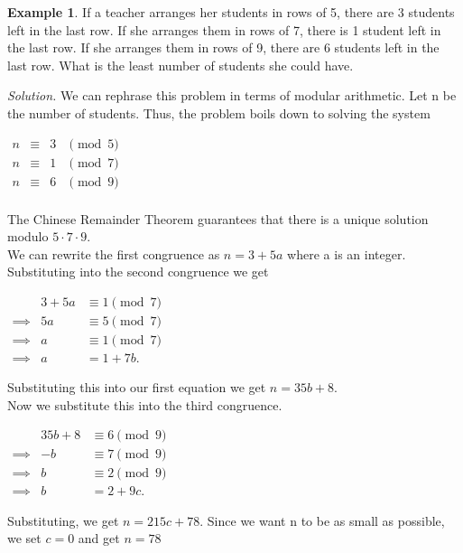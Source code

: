 \documentclass[letterpaper]{article}
\theoremstyle{plain}
\theoremstyle{definition}
\newtheorem{example}[thm]{Example}
\theoremstyle{remark}
\begin{document}
\begin{mdframed}
    \begin{example}
    If a teacher arranges her students in rows of 5, there are 3 students left in the last row.
    If she arranges them in rows of 7, there is 1 student left in the last row. If she arranges them in rows of 9, 
    there are 6 students left in the last row. What is the least number of students she could have.
    \end{example}
\end{mdframed}
\emph{Solution.} We can rephrase this problem in terms of modular arithmetic. Let n be the number of students. Thus, the problem boils down to solving the system
    \begin{center}
        $\begin{array}{rcll}
            n &\equiv &3 &\pmod{5}\\
            n &\equiv &1 &\pmod{7}\\
            n &\equiv &6 &\pmod{9}\\
        \end{array}$
    \end{center}
    The Chinese Remainder Theorem guarantees that there is a unique solution modulo $5\cdot 7 \cdot 9$.\\
    We can rewrite the first congruence as $n = 3 + 5a$ where a is an integer.
    Substituting into the second congruence we get 
    \begin{center}
        $\begin{array}{rrll}
            &3+5a &\equiv 1 \pmod{7} \\
         \implies &5a &\equiv 5 \pmod{7} \\
         \implies &a &\equiv 1 \pmod{7}\\
         \implies &a &= 1 + 7b.
        \end{array}$
    \end{center}
    Substituting this into our first equation we get $n = 35b + 8$. \\
    Now we substitute this into the third congruence.
    \begin{center}
        $\begin{array}{rrll}
            &35b+8 &\equiv 6 \pmod{9} \\
         \implies &-b &\equiv 7 \pmod{9} \\
         \implies &b &\equiv 2 \pmod{9}\\
         \implies &b &= 2 + 9c.
        \end{array}$
    \end{center}
    Substituting, we get $n = 215c + 78$. Since we want n to be as small as possible, we set $c=0$ and get $\boxed{n=78}$
\end{document}
